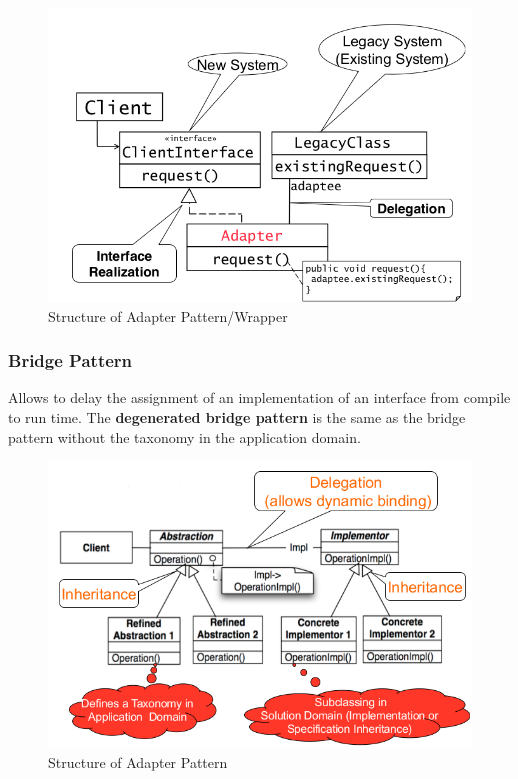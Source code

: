 \begin{figure}[h]
	\centering
	\includegraphics[width=\linewidth]{images/pattern_adapter.png}
	\caption{Structure of Adapter Pattern/Wrapper}
\end{figure}
\newpage

\subsubsection{Bridge Pattern}
Allows to delay the assignment of an implementation of an interface from compile to run time.
The \textbf{degenerated bridge pattern} is the same as the bridge pattern without the taxonomy in the application domain.
\begin{figure}[h]
	\centering
	\includegraphics[width=\linewidth]{images/pattern_bridge.png}
	\caption{Structure of Adapter Pattern}
\end{figure}
\newpage

